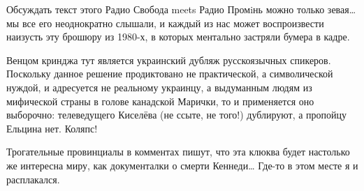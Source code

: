 Обсуждать текст этого Радио Свобода meets Радио Промiнь можно только зевая… мы
все его неоднократно слышали, и каждый из нас может воспроизвести наизусть эту
брошюру из 1980-х, в которых ментально застряли бумера в кадре. 

Венцом кринджа тут является украинский дубляж русскоязычных спикеров. Поскольку
данное решение продиктовано не практической, а символической нуждой, и
адресуется не реальному украинцу, а выдуманным людям из мифической страны в
голове канадской Марички, то и применяется оно выборочно: телеведущего Киселёва
(не ссыте, не того!) дублируют, а пропойцу Ельцина нет. Коляпс!

Трогательные провинциалы в комментах пишут, что эта клюква будет настолько же
интересна миру, как документалки о смерти Кеннеди… Где-то в этом месте я и
расплакался.


